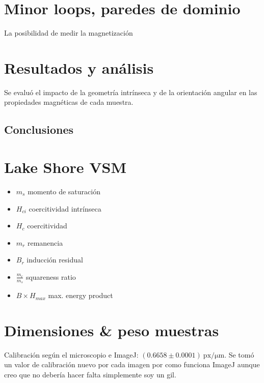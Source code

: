 \documentclass[aps,prd,a4paper,10pt, twocolumn,amsmath,showpacs,superscriptaddress,nofootinbib,preprintnumbers,notitlepage]{revtex4-2}
\begin{document}
\section{Minor loops, paredes de dominio}

La posibilidad de medir la magnetización 

\section{Resultados y análisis}
%
%
Se evaluó el impacto de la geometría intrínseca y de la orientación angular en las propiedades magnéticas de cada muestra.













\subsection{Conclusiones}

\section{Lake Shore VSM}
\begin{itemize}
\item $m_s$ momento de saturación

\item $H_{ci}$ coercitividad intrínseca

\item $H_c$ coercitividad

\item $m_r$ remanencia

\item $B_r$ inducción residual

\item $\displaystyle\frac{m_r}{m_s}$ squareness ratio

\item $B\times H_{max}$ max. energy product
\end{itemize}

\section{Dimensiones \& peso muestras}
Calibración según el microscopio e ImageJ: $(0.6658\pm0.0001)~\mathrm{px}/\mathrm{\mu m}$. Se tomó un valor de calibración nuevo por cada imagen por como funciona ImageJ aunque creo que no debería hacer falta simplemente soy un gil.
\end{document}
